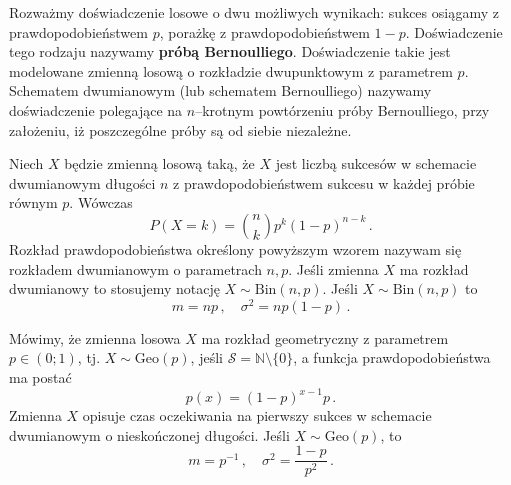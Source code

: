 \documentclass{myclass}
\numberwithin{equation}{section}
\begin{document}
\begin{definition}
Rozważmy doświadczenie losowe o dwu możliwych wynikach: sukces osiągamy z prawdopodobieństwem \(p\),
porażkę z prawdopodobieństwem \(1-p\). Doświadczenie tego rodzaju nazywamy \textbf{próbą
Bernoulliego}. Doświadczenie takie jest modelowane zmienną losową o rozkładzie dwupunktowym z
parametrem \(p\). Schematem dwumianowym (lub schematem Bernoulliego) nazywamy doświadczenie
polegające na \(n\)--krotnym powtórzeniu próby Bernoulliego, przy założeniu, iż poszczególne próby
są od siebie niezależne.
\end{definition}

\begin{definition}
Niech \(X\) będzie zmienną losową taką, że \(X\) jest liczbą sukcesów w schemacie dwumianowym
długości \(n\) z prawdopodobieństwem sukcesu w każdej próbie równym \(p\). Wówczas
\begin{equation*}
    P(X = k) = {n \choose k} p^k (1 - p)^{n-k}\,.
\end{equation*}
Rozkład prawdopodobieństwa określony powyższym wzorem nazywam się rozkładem dwumianowym o
parametrach \(n,p\). Jeśli zmienna \(X\) ma rozkład dwumianowy to stosujemy notację \(X \sim
\mathrm{Bin}(n,p)\). Jeśli \(X \sim \mathrm{Bin}(n,p)\) to
\begin{equation*}
    m = np\,,\quad \sigma^2 = np(1-p)\,.
\end{equation*}
\end{definition}

\begin{definition}
Mówimy, że zmienna losowa \(X\) ma rozkład geometryczny z parametrem \(p \in (0;1)\), tj. \(X \sim
\mathrm{Geo}(p)\), jeśli \(\mathcal{S} = \mathbb{N} \setminus \{0\}\), a funkcja prawdopodobieństwa
ma postać
\begin{equation*}
    p(x) = (1-p)^{x-1}p\,.
\end{equation*}
Zmienna \(X\) opisuje czas oczekiwania na pierwszy sukces w schemacie dwumianowym o nieskończonej
długości. Jeśli \(X \sim \mathrm{Geo}(p)\), to
\begin{equation*}
    m = p^{-1}\,,\quad \sigma^2 = \frac{1 - p}{p^2}\,.
\end{equation*}
\end{definition}
\end{document}
